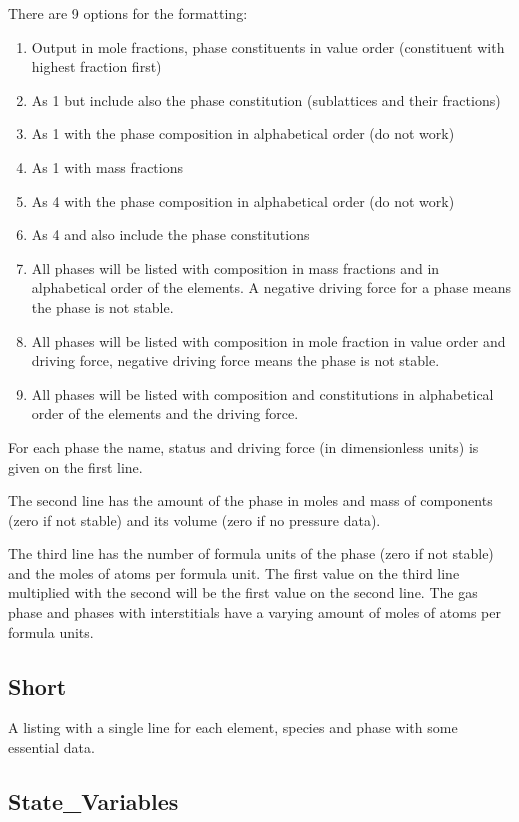 \documentclass[12pt]{article}
\begin{document}
There are 9 options for the formatting:
\begin{enumerate}
\item Output in mole fractions, phase constituents in value order
  (constituent with highest fraction first)
\item As 1 but include also the phase constitution (sublattices and
  their fractions)
\item As 1 with the phase composition in alphabetical order (do not work)
\item As 1 with mass fractions
\item As 4 with the phase composition in alphabetical order (do not work)
\item As 4 and also include the phase constitutions
\item All phases will be listed with composition in mass fractions and
  in alphabetical order of the elements.  A negative driving force for
  a phase means the phase is not stable.
\item All phases will be listed with composition in mole fraction in
  value order and driving force, negative driving force means the
  phase is not stable.
\item All phases will be listed with composition and constitutions in
  alphabetical order of the elements and the driving force.
\end{enumerate}

For each phase the name, status and driving force (in dimensionless
units) is given on the first line.  

The second line has the amount of the phase in moles and mass of
components (zero if not stable) and its volume (zero if no pressure
data).  

The third line has the number of formula units of the phase (zero if
not stable) and the moles of atoms per formula unit.  The first value
on the third line multiplied with the second will be the first value
on the second line.  The gas phase and phases with interstitials have
a varying amount of moles of atoms per formula units.

\subsection{Short}

A listing with a single line for each element, species and phase with
some essential data.

\subsection{State\_Variables}
\end{document}
